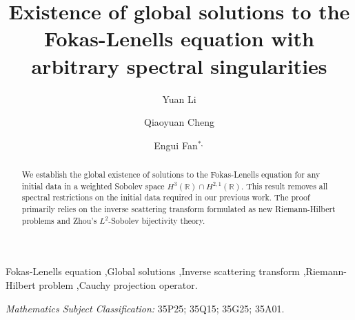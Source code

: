 \documentclass[preprint,compress,12pt]{elsarticle}
\numberwithin{equation}{section}
\begin{document}
\begin{frontmatter}
\title{Existence of global solutions to the Fokas-Lenells equation with arbitrary spectral singularities}


\author[inst1]{Yuan Li}
\author[inst2]{Qiaoyuan Cheng}
\author[inst1]{Engui Fan$^{*,}$}

\address[inst1]{ School of Mathematical Sciences and Key Laboratory of Mathematics for Nonlinear Science, Fudan University, Shanghai, 200433, China}
\address[inst2]{School of Mathematics, Shanghai University of Finance and Economics, Shanghai, 200433, China\\
* Corresponding author and e-mail address: faneg@fudan.edu.cn  }

\begin{abstract}
We establish the global existence of solutions to the Fokas-Lenells equation for any initial data in 
a weighted Sobolev space  $H^{3}(\mathbb{R})\cap H^{2,1}(\mathbb{R})$.
This result removes  all spectral restrictions  on  the initial data required in our previous work.
 The proof primarily relies on the inverse scattering transform formulated as new  Riemann-Hilbert problems  and Zhou's $L^{2}$-Sobolev bijectivity theory.
\end{abstract}


\begin{keyword}
   Fokas-Lenells equation  \sep Global solutions \sep Inverse scattering transform \sep Riemann-Hilbert problem  \sep Cauchy projection operator.  %

  \textit{Mathematics Subject Classification: }35P25; 35Q15; 35G25; 35A01.

  \end{keyword}
\end{frontmatter}
\tableofcontents
\end{document}
